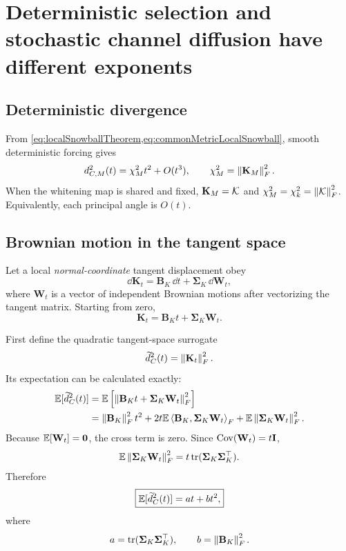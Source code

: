 \chapter{Deterministic selection and stochastic channel diffusion have different exponents}

\section{Deterministic divergence}

From \cref{eq:localSnowballTheorem,eq:commonMetricLocalSnowball}, smooth deterministic forcing gives
\begin{equation}
d_{C,M}^2(t)=\chi_M^2t^2+O(t^3),
\qquad
\chi_M^2=\left\lVert \mathbf K_M\right\rVert_F^2.
\end{equation}
When the whitening map is shared and fixed, \(\mathbf K_M=\mathcal K\) and \(\chi_M^2=\chi_k^2=\left\lVert \mathcal K\right\rVert_F^2\). Equivalently, each principal angle is \(O(t)\).

\section{Brownian motion in the tangent space}

Let a local \emph{normal-coordinate} tangent displacement obey
\begin{equation}
\dd\mathbf K_t=\mathbf B_K\,\dd t+\boldsymbol\Sigma_K\,\dd\mathbf W_t,
\label{eq:tangentSDE}
\end{equation}
where \(\mathbf W_t\) is a vector of independent Brownian motions after vectorizing the tangent matrix. Starting from zero,
\begin{equation}
\mathbf K_t=\mathbf B_Kt+\boldsymbol\Sigma_K\mathbf W_t.
\end{equation}

First define the quadratic tangent-space surrogate
\begin{equation}
\widetilde d_C^2(t)=\left\lVert \mathbf K_t\right\rVert_F^2.
\label{eq:tangentDistanceSurrogate}
\end{equation}
Its expectation can be calculated exactly:
\begin{align}
\mathbb E[\widetilde d_C^2(t)]
&=\mathbb E\left[\left\lVert \mathbf B_Kt+\boldsymbol\Sigma_K\mathbf W_t\right\rVert_F^2\right]\\
&=\left\lVert \mathbf B_K\right\rVert_F^2t^2
+2t\mathbb E\left\langle \mathbf B_K,\boldsymbol\Sigma_K\mathbf W_t\right\rangle_F
+\mathbb E\left\lVert \boldsymbol\Sigma_K\mathbf W_t\right\rVert_F^2.
\end{align}
Because \(\mathbb E[\mathbf W_t]=\mathbf{0}\), the cross term is zero. Since \(\operatorname{Cov}(\mathbf W_t)=t\mathbf{I}\),
\begin{equation}
\mathbb E\left\lVert \boldsymbol\Sigma_K\mathbf W_t\right\rVert_F^2
=t\operatorname{tr}(\boldsymbol\Sigma_K\boldsymbol\Sigma_K^\top).
\end{equation}
Therefore
\begin{equation}
\boxed{
\mathbb E[\widetilde d_C^2(t)]
=a t+b t^2,}
\label{eq:selectionDriftMixture}
\end{equation}
where
\begin{equation}
a=\operatorname{tr}(\boldsymbol\Sigma_K\boldsymbol\Sigma_K^\top),
\qquad
b=\left\lVert \mathbf B_K\right\rVert_F^2.
\end{equation}

